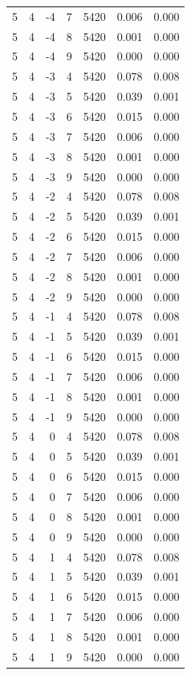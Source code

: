 \begin{table}
\begin{tabular}{rrrrrrr}
5 & 4 & -4 & 7 & 5420 & 0.006 & 0.000 \\
5 & 4 & -4 & 8 & 5420 & 0.001 & 0.000 \\
5 & 4 & -4 & 9 & 5420 & 0.000 & 0.000 \\
5 & 4 & -3 & 4 & 5420 & 0.078 & 0.008 \\
5 & 4 & -3 & 5 & 5420 & 0.039 & 0.001 \\
5 & 4 & -3 & 6 & 5420 & 0.015 & 0.000 \\
5 & 4 & -3 & 7 & 5420 & 0.006 & 0.000 \\
5 & 4 & -3 & 8 & 5420 & 0.001 & 0.000 \\
5 & 4 & -3 & 9 & 5420 & 0.000 & 0.000 \\
5 & 4 & -2 & 4 & 5420 & 0.078 & 0.008 \\
5 & 4 & -2 & 5 & 5420 & 0.039 & 0.001 \\
5 & 4 & -2 & 6 & 5420 & 0.015 & 0.000 \\
5 & 4 & -2 & 7 & 5420 & 0.006 & 0.000 \\
5 & 4 & -2 & 8 & 5420 & 0.001 & 0.000 \\
5 & 4 & -2 & 9 & 5420 & 0.000 & 0.000 \\
5 & 4 & -1 & 4 & 5420 & 0.078 & 0.008 \\
5 & 4 & -1 & 5 & 5420 & 0.039 & 0.001 \\
5 & 4 & -1 & 6 & 5420 & 0.015 & 0.000 \\
5 & 4 & -1 & 7 & 5420 & 0.006 & 0.000 \\
5 & 4 & -1 & 8 & 5420 & 0.001 & 0.000 \\
5 & 4 & -1 & 9 & 5420 & 0.000 & 0.000 \\
5 & 4 & 0 & 4 & 5420 & 0.078 & 0.008 \\
5 & 4 & 0 & 5 & 5420 & 0.039 & 0.001 \\
5 & 4 & 0 & 6 & 5420 & 0.015 & 0.000 \\
5 & 4 & 0 & 7 & 5420 & 0.006 & 0.000 \\
5 & 4 & 0 & 8 & 5420 & 0.001 & 0.000 \\
5 & 4 & 0 & 9 & 5420 & 0.000 & 0.000 \\
5 & 4 & 1 & 4 & 5420 & 0.078 & 0.008 \\
5 & 4 & 1 & 5 & 5420 & 0.039 & 0.001 \\
5 & 4 & 1 & 6 & 5420 & 0.015 & 0.000 \\
5 & 4 & 1 & 7 & 5420 & 0.006 & 0.000 \\
5 & 4 & 1 & 8 & 5420 & 0.001 & 0.000 \\
5 & 4 & 1 & 9 & 5420 & 0.000 & 0.000 \\

\end{tabular}
\end{table}
